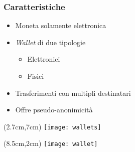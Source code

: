 \begin{frame}
 \frametitle{Caratteristiche}
 
 \begin{itemize}
  \item<1-> Moneta solamente elettronica
  \item<2-> \textit{Wallet} di due tipologie %
  \begin{itemize}
   \item Elettronici
   \item Fisici
  \end{itemize}
  \item<3-> Trasferimenti con multipli destinatari
  \item<4-> Offre pseudo-anonimicità
 \end{itemize}
 
 
 \begin{textblock*}{5cm}(2.7cm,7cm)
  \texttt{[image: wallets]}
 \end{textblock*}
 
 
 \begin{textblock*}{5cm}(8.5cm,2cm)
  \texttt{[image: wallet]}
 \end{textblock*}

 
\end{frame}
